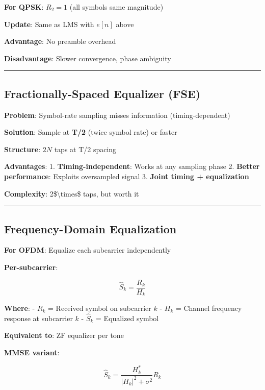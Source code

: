 \textbf{For QPSK}: \(R_2 = 1\) (all symbols same magnitude)

\textbf{Update}: Same as LMS with \(e[n]\) above

\textbf{Advantage}: No preamble overhead

\textbf{Disadvantage}: Slower convergence, phase ambiguity

\begin{center}\rule{0.5\linewidth}{0.5pt}\end{center}

\subsection{Fractionally-Spaced Equalizer
(FSE)}\label{fractionally-spaced-equalizer-fse}

\textbf{Problem}: Symbol-rate sampling misses information
(timing-dependent)

\textbf{Solution}: Sample at \textbf{T/2} (twice symbol rate) or faster

\textbf{Structure}: \(2N\) taps at T/2 spacing

\textbf{Advantages}: 1. \textbf{Timing-independent}: Works at any
sampling phase 2. \textbf{Better performance}: Exploits oversampled
signal 3. \textbf{Joint timing + equalization}

\textbf{Complexity}: 2\$\textbackslash times\$ taps, but worth it

\begin{center}\rule{0.5\linewidth}{0.5pt}\end{center}

\subsection{Frequency-Domain
Equalization}\label{frequency-domain-equalization}

\textbf{For OFDM}: Equalize each subcarrier independently

\textbf{Per-subcarrier}:

\[
\hat{S}_k = \frac{R_k}{H_k}
\]

\textbf{Where}: - \(R_k\) = Received symbol on subcarrier \(k\) -
\(H_k\) = Channel frequency response at subcarrier \(k\) - \(\hat{S}_k\)
= Equalized symbol

\textbf{Equivalent to}: ZF equalizer per tone

\textbf{MMSE variant}:

\[
\hat{S}_k = \frac{H_k^*}{|H_k|^2 + \sigma^2} R_k
\]

